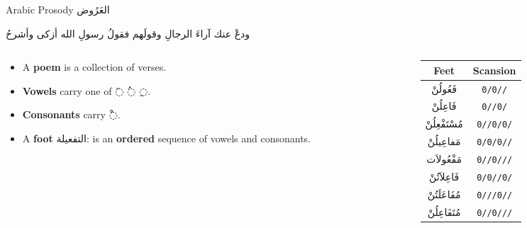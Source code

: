 \documentclass[10pt]{beamer}
\begin{document}
\begin{frame}[fragile]{Arabic Prosody \textarabic{العَرُوض}}
    \begin{Arabic}
    ودعْ عنك آراءَ الرجالِ وقولَهم\hspace{1em}  فقولُ رسولِ الله أزكى وأشرحُ
    \end{Arabic}

\begin{columns}
\begin{column}{0.7\textwidth}

\begin{itemize}
  \item A \textbf{poem } is a collection of verses.
  \item \textbf{Vowels}  carry one of \textarabic{◌َ  ◌ُ  ◌ِ}.
  \item \textbf{Consonants} carry \textarabic{◌ْ}.
  \item A \textbf{foot} \textarabic{التفعيلة}: is an \textbf{ordered} sequence of vowels and consonants.
\end{itemize}

\end{column}


\begin{column}{0.5\textwidth}
\begin{center}
  \begin{tabular}{|c|c|} \hline
    \textbf{Feet} & \textbf{Scansion} \\
    \hline
    \textarabic{فَعُولُنْ}  & \texttt{0/0//}\\
    \textarabic{فَاعِلُنْ}  & \texttt{0//0/}\\
    \textarabic{مُسْتَفْعِلُنْ}& \texttt{0//0/0/}\\
    \textarabic{مَفاعِيلُنْ}& \texttt{0/0/0//}\\
    \textarabic{مَفْعُولاَت} & \texttt{0//0///}\\
    \textarabic{فَاعِلاَتُنْ} & \texttt{0/0//0/}\\
    \textarabic{مُفَاعَلَتُنْ}& \texttt{0///0//}\\
    \textarabic{مُتَفَاعِلُنْ}& \texttt{0//0///}\\
    \hline
  \end{tabular}
\end{center}
\end{column}
\end{columns}
\end{frame}
\end{document}

